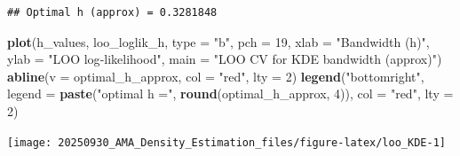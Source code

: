 \documentclass[
]{article}
\newenvironment{Shaded}{\begin{snugshade}}{\end{snugshade}}
\newcommand{\AttributeTok}[1]{\textcolor[rgb]{0.13,0.29,0.53}{#1}}
\newcommand{\DecValTok}[1]{\textcolor[rgb]{0.00,0.00,0.81}{#1}}
\newcommand{\FunctionTok}[1]{\textcolor[rgb]{0.13,0.29,0.53}{\textbf{#1}}}
\newcommand{\NormalTok}[1]{#1}
\newcommand{\StringTok}[1]{\textcolor[rgb]{0.31,0.60,0.02}{#1}}
\begin{document}
\begin{verbatim}
## Optimal h (approx) = 0.3281848
\end{verbatim}

\begin{Shaded}
\begin{Highlighting}[]
\FunctionTok{plot}\NormalTok{(h\_values, loo\_loglik\_h, }\AttributeTok{type =} \StringTok{"b"}\NormalTok{, }\AttributeTok{pch =} \DecValTok{19}\NormalTok{,}
     \AttributeTok{xlab =} \StringTok{"Bandwidth (h)"}\NormalTok{, }\AttributeTok{ylab =} \StringTok{"LOO log{-}likelihood"}\NormalTok{,}
     \AttributeTok{main =} \StringTok{"LOO CV for KDE bandwidth (approx)"}\NormalTok{)}
\FunctionTok{abline}\NormalTok{(}\AttributeTok{v =}\NormalTok{ optimal\_h\_approx, }\AttributeTok{col =} \StringTok{"red"}\NormalTok{, }\AttributeTok{lty =} \DecValTok{2}\NormalTok{)}
\FunctionTok{legend}\NormalTok{(}\StringTok{"bottomright"}\NormalTok{, }\AttributeTok{legend =} \FunctionTok{paste}\NormalTok{(}\StringTok{"optimal h ="}\NormalTok{, }\FunctionTok{round}\NormalTok{(optimal\_h\_approx, }\DecValTok{4}\NormalTok{)),}
       \AttributeTok{col =} \StringTok{"red"}\NormalTok{, }\AttributeTok{lty =} \DecValTok{2}\NormalTok{)}
\end{Highlighting}
\end{Shaded}

\begin{center}\texttt{[image: 20250930\_AMA\_Density\_Estimation\_files/figure-latex/loo\_KDE-1]} \end{center}
\end{document}
